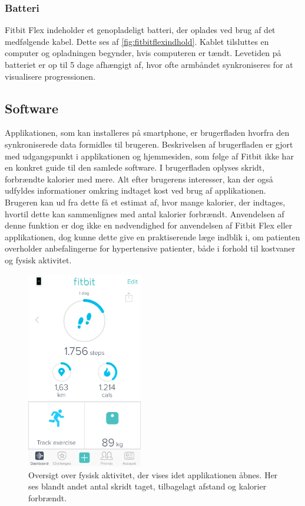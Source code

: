 \subsubsection{Batteri} 
Fitbit Flex indeholder et genopladeligt batteri, der oplades ved brug af det medfølgende kabel. Dette ses af \autoref{fig:fitbitflexindhold}. Kablet tilsluttes en computer og opladningen begynder, hvis computeren er tændt. 
Levetiden på batteriet er op til 5 dage afhængigt af, hvor ofte armbåndet synkroniseres for at visualisere progressionen.


\subsection{Software}
Applikationen, som kan installeres på smartphone, er brugerfladen hvorfra den synkroniserede data formidles til brugeren. Beskrivelsen af brugerfladen er gjort med udgangspunkt i applikationen og hjemmesiden, som følge af Fitbit ikke har en konkret guide til den samlede software. I brugerfladen oplyses skridt, forbrændte kalorier med mere. 
Alt efter brugerens interesser, kan der også udfyldes informationer omkring indtaget kost ved brug af applikationen. Brugeren kan ud fra dette få et estimat af, hvor mange kalorier, der indtages, hvortil dette kan sammenlignes med antal kalorier forbrændt. Anvendelsen af denne funktion er dog ikke en nødvendighed for anvendelsen af Fitbit Flex eller applikationen, dog kunne dette give en praktiserende læge indblik i, om patienten overholder anbefalingerne for hypertensive patienter, både i forhold til kostvaner og fysisk aktivitet.

\begin{figure}[H]
	\centering
	\includegraphics[width=0.45\textwidth]{figures/burgerfladeoversigt}
	\caption{Oversigt over fysisk aktivitet, der vises idet applikationen åbnes. Her ses blandt andet antal skridt taget, tilbagelagt afstand og kalorier forbrændt.}
	\label{fig:brugerfladeoversigt}
\end{figure}


